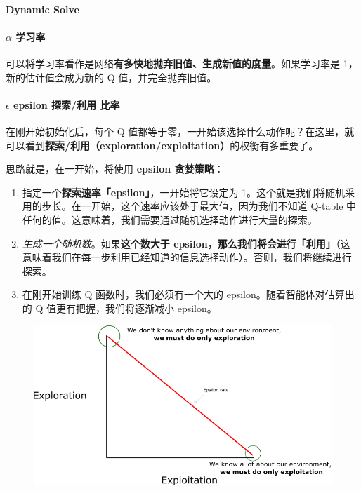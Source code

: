 \documentclass[UTF8,a4paper,12pt]{ctexbook}
\begin{document}
			\paragraph{Dynamic Solve}

			
			\paragraph{$\alpha$ 学习率}
				可以将学习率看作是网络\textbf{有多快地抛弃旧值、生成新值的度量}。如果学习率是 1，新的估计值会成为新的 Q 值，并完全抛弃旧值。
			
			\paragraph{$\epsilon$ epsilon 探索/利用 比率}
				在刚开始初始化后，每个 Q 值都等于零，一开始该选择什么动作呢？在这里，就可以看到\textbf{探索/利用}\textbf{（exploration/exploitation）}的权衡有多重要了。
			
				思路就是，在一开始，将使用 \textbf{epsilon 贪婪策略}：
				
				\begin{enumerate}[itemindent = 1em]
					\item 指定一个\textbf{探索速率「epsilon」}，一开始将它设定为 1。这个就是我们将随机采用的步长。在一开始，这个速率应该处于最大值，因为我们不知道 Q-table 中任何的值。这意味着，我们需要通过随机选择动作进行大量的探索。
					\item \textit{生成一个随机数}。如果\textbf{这个数大于 epsilon，那么我们将会进行「利用」}（这意味着我们在每一步利用已经知道的信息选择动作）。否则，我们将继续进行探索。
					\item 在刚开始训练 Q 函数时，我们必须有一个大的 epsilon。随着智能体对估算出的 Q 值更有把握，我们将逐渐减小 epsilon。
				\end{enumerate}
				
				\begin{figure}[H]
					\centering
					\includegraphics[width=\linewidth]{epsilon}
				\end{figure}
	
\end{document}
